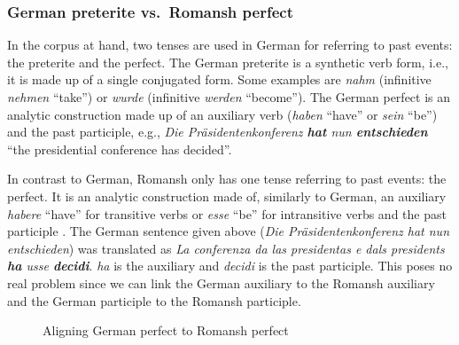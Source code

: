 \subsubsection{German preterite vs.~Romansh perfect}
In the corpus at hand, two tenses are used in German for referring to past events: the preterite and the perfect. 
The German preterite is a synthetic verb form, i.e., it is made up of a single conjugated form. 
Some examples are \emph{nahm} (infinitive \emph{nehmen} \enquote{take}) or \emph{wurde} (infinitive \emph{werden} \enquote{become}). 
The German perfect is an analytic construction made up of an auxiliary verb (\emph{haben} \enquote{have} or \emph{sein} \enquote{be}) and the past participle, e.g., \emph{Die Präsidentenkonferenz \textbf{hat} nun \textbf{entschieden}} \enquote{the presidential conference has decided}. 

In contrast to German, Romansh only has one tense referring to past events: the perfect. 
It is an analytic construction made of, similarly to German, an auxiliary \emph{habere} \enquote{have} for transitive verbs or \emph{esse} \enquote{be} for intransitive verbs and the past participle \autocite[189]{bossong2008}. 
The German sentence given above (\emph{Die Präsidentenkonferenz hat nun entschieden}) was translated as \emph{La conferenza da las presidentas e dals presidents \textbf{ha} usse \textbf{decidi}}. 
\emph{ha} is the auxiliary and \emph{decidi} is the past participle. 
This poses no real problem since we can link the German auxiliary to the Romansh auxiliary and the German participle to the Romansh participle.

\begin{figure}
\centering
            
        
        \vspace*{1cm}
        
             
            

    
\caption{Aligning German perfect to Romansh perfect}
\end{figure}


